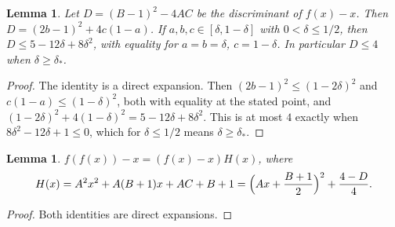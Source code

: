 \documentclass[11pt]{amsart}
\newtheorem{lemma}[theorem]{Lemma}
\theoremstyle{definition}
\theoremstyle{remark}
\begin{document}
\begin{lemma}\label{lem:disc}
Let $D=(B-1)^2-4AC$ be the discriminant of $f(x)-x$. Then $D=(2b-1)^2+4c(1-a)$. If $a,b,c\in[\delta,1-\delta]$ with
$0<\delta\le1/2$, then $D\le5-12\delta+8\delta^2$, with equality for $a=b=\delta$, $c=1-\delta$. In particular $D\le4$
when $\delta\ge\delta_*$.
\end{lemma}

\begin{proof}
The identity is a direct expansion. Then $(2b-1)^2\le(1-2\delta)^2$ and $c(1-a)\le(1-\delta)^2$, both with equality at
the stated point, and $(1-2\delta)^2+4(1-\delta)^2=5-12\delta+8\delta^2$. This is at most $4$ exactly when
$8\delta^2-12\delta+1\le0$, which for $\delta\le1/2$ means $\delta\ge\delta_*$.
\end{proof}

\begin{lemma}\label{lem:second}
$f(f(x))-x=(f(x)-x)H(x)$, where
\[
H(x)=A^2x^2+A(B+1)x+AC+B+1=\Bigl(Ax+\frac{B+1}{2}\Bigr)^2+\frac{4-D}{4}.
\]
\end{lemma}

\begin{proof}
Both identities are direct expansions.
\end{proof}
\end{document}
